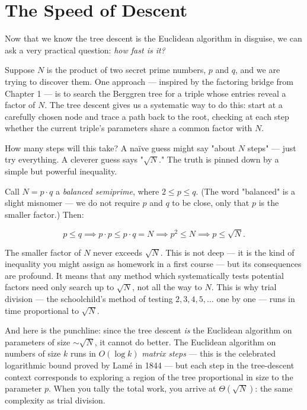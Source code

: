\ornbreak



\section{The Speed of Descent}


Now that we know the tree descent is the Euclidean algorithm in disguise, we can ask a very practical question: \textit{how fast is it?}

Suppose $N$ is the product of two secret prime numbers, $p$ and $q$, and we are trying to discover them. One approach --- inspired by the factoring bridge from Chapter 1 --- is to search the Berggren tree for a triple whose entries reveal a factor of $N$. The tree descent gives us a systematic way to do this: start at a carefully chosen node and trace a path back to the root, checking at each step whether the current triple's parameters share a common factor with $N$.

How many steps will this take? A naïve guess might say "about $N$ steps" --- just try everything. A cleverer guess says "$\sqrt{N}$." The truth is pinned down by a simple but powerful inequality.

Call $N = p \cdot q$ a \textit{balanced semiprime}, where $2 \le p \le q$. (The word "balanced" is a slight misnomer --- we do not require $p$ and $q$ to be close, only that $p$ is the smaller factor.) Then:

\[
p \le q \implies p \cdot p \le p \cdot q = N \implies p^2 \le N \implies p \le \sqrt{N}.
\]

The smaller factor of $N$ never exceeds $\sqrt{N}$. This is not deep --- it is the kind of inequality you might assign as homework in a first course --- but its consequences are profound. It means that any method which systematically tests potential factors need only search up to $\sqrt{N}$, not all the way to $N$. This is why trial division --- the schoolchild's method of testing $2, 3, 4, 5, \ldots$ one by one --- runs in time proportional to $\sqrt{N}$.

And here is the punchline: since the tree descent \textit{is} the Euclidean algorithm on parameters of size $\sim\!\sqrt{N}$, it cannot do better. The Euclidean algorithm on numbers of size $k$ runs in $O(\log k)$ \textit{matrix steps} --- this is the celebrated logarithmic bound proved by Lamé in 1844 --- but each step in the tree-descent context corresponds to exploring a region of the tree proportional in size to the parameter $p$. When you tally the total work, you arrive at $\Theta(\sqrt{N})$: the same complexity as trial division.

